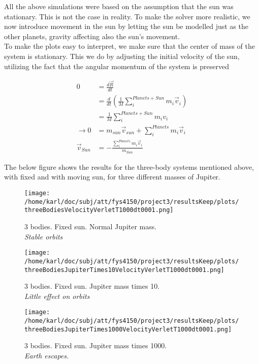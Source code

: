 \documentclass{article}
\begin{document}
All the above simulations were based on the assumption that the sun was stationary. This is not the case in reality. To make the  solver more realistic, we now introduce movement in the sun by letting the sun be modelled just as the other planets, gravity affecting also the sun's movement. \\

To make the plots easy to interpret, we make sure that the center of mass of the system is stationary. This we do by adjusting the initial velocity of the sun, utilizing the fact that the angular momentum of the system is preserved

\begin{subequations}
	\begin{align}
	0 &= \frac{d \vec R}{dt}	\\
	&= \frac{d}{dt} (\frac{1}{M} \sum_i^{Planets+Sun} m_i \vec{v}_i)\\
	&= \frac{1}{M} \sum_i^{Planets+Sun} m_i v_i \\
	\rightarrow 0 &=m_{sun} \vec{v}_{sun} + \sum_i^{Planets} m_i \vec{v}_i \\
	\vec{v}_{Sun} &= - \frac{\sum_i^{Planets} m_i \vec{v}_i}{m_{Sun}}
	\end{align}
\end{subequations}

The below figure shows the results for the three-body systems mentioned above, with fixed and with moving sun, for three different masses of Jupiter.

\begin{minipage}{.3\textwidth} 
	\begin{figure}[H]
		\centering
		\texttt{[image: /home/karl/doc/subj/att/fys4150/project3/resultsKeep/plots/threeBodiesVelocityVerletT1000dt0001.png]}
		\caption{3 bodies. Fixed sun. Normal Jupiter mass. \\ \textit{Stable orbits}}
		\label{1}
	\end{figure}
\end{minipage}\hfill
\begin{minipage}{.3\textwidth} 
	\begin{figure}[H]
		\centering
		\texttt{[image: /home/karl/doc/subj/att/fys4150/project3/resultsKeep/plots/threeBodiesJupiterTimes10VelocityVerletT1000dt0001.png]}
		\caption{3 bodies. Fixed sun. Jupiter mass times 10. \\ \textit{Little effect on orbits}}
		\label{1}
	\end{figure}
\end{minipage}\hfill
\begin{minipage}{.3\textwidth} 
	\begin{figure}[H]
		\centering
		\texttt{[image: /home/karl/doc/subj/att/fys4150/project3/resultsKeep/plots/threeBodiesJupiterTimes1000VelocityVerletT1000dt0001.png]}
		\caption{3 bodies. Fixed sun.  Jupiter mass times 1000. \\ \textit{Earth escapes.}}
		\label{1}
	\end{figure}
\end{minipage}\hfill
\vspace{2ex}
\end{document}
